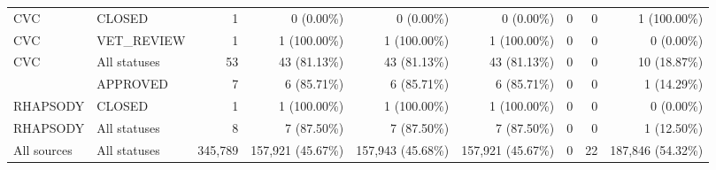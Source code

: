 \begin{longtable}{@{}llrrrrrrr@{}}
{CVC} & {CLOSED} & 1 & 0 (0.00\%) & 0 (0.00\%) & 0 (0.00\%) & 0 & 0 & 1 (100.00\%) \\

{CVC} & {VET\_REVIEW} & 1 & 1 (100.00\%) & 1 (100.00\%) & 1 (100.00\%) & 0 & 0 & 0 (0.00\%) \\
\midrule
{CVC} & {All statuses} & 53 & 43 (81.13\%) & 43 (81.13\%) & 43 (81.13\%) & 0 & 0 & 10 (18.87\%) \\
\addlinespace[2pt]
{RHAPSODY} & {APPROVED} & 7 & 6 (85.71\%) & 6 (85.71\%) & 6 (85.71\%) & 0 & 0 & 1 (14.29\%) \\

{RHAPSODY} & {CLOSED} & 1 & 1 (100.00\%) & 1 (100.00\%) & 1 (100.00\%) & 0 & 0 & 0 (0.00\%) \\
\midrule
{RHAPSODY} & {All statuses} & 8 & 7 (87.50\%) & 7 (87.50\%) & 7 (87.50\%) & 0 & 0 & 1 (12.50\%) \\
\addlinespace[2pt]
\midrule
{All sources} & {All statuses} & 345,789 & 157,921 (45.67\%) & 157,943 (45.68\%) & 157,921 (45.67\%) & 0 & 22 & 187,846 (54.32\%) \\
\bottomrule
\end{longtable}
